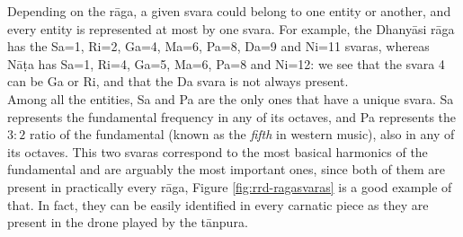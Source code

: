 \begin{table}
  \centering
  \caption{The twelve svaras and their sixteen names (from \cite[p.47]{krishna}).}
  \label{fig:svaras}
\end{table}

Depending on the r\=aga, a given svara could belong to one entity or another, and every entity is represented at most by one svara. For example, the Dhany\=asi r\=aga has the Sa=1, Ri=2, Ga=4, Ma=6, Pa=8, Da=9 and Ni=11 svaras, whereas N\=a\d{t}a has Sa=1, Ri=4, Ga=5, Ma=6, Pa=8 and Ni=12: we see that the svara 4 can be Ga or Ri, and that the Da svara is not always present.\\

Among all the entities, Sa and Pa are the only ones that have a unique svara. Sa represents the fundamental frequency in any of its octaves, and Pa represents the \(3:2\) ratio of the fundamental (known as the {\it fifth} in western music), also in any of its octaves. This two svaras correspond to the most basical harmonics of the fundamental and are arguably the most important ones, since both of them are present in practically every r\=aga, Figure \ref{fig:rrd-ragasvaras} is a good example of that. In fact, they can be easily identified in every carnatic piece as they are present in the drone played by the t\=anpura.

